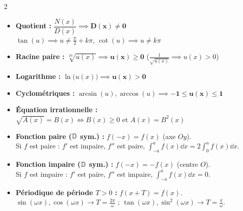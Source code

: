 {\fontsize{9.4pt}{11.4pt}\selectfont
\setlength{\columnsep}{18pt}
\begin{multicols}{2}

\begin{itemize}[leftmargin=1.2em, itemsep=1.5pt, topsep=2pt]
    \item \textbf{Quotient :} $\dfrac{N(x)}{D(x)} \implies \mathbf{D(x) \neq 0}$\\
    $\tan(u) \implies u \neq \frac{\pi}{2} + k\pi$, \quad $\cot(u) \implies u \neq k\pi$
    \item \textbf{Racine paire :} $\sqrt[2n]{u(x)} \implies \mathbf{u(x) \ge 0}$ \quad ($\frac{1}{\sqrt{u(x)}} \implies u(x) > 0$)
    \item \textbf{Logarithme :} $\ln\bigl(u(x)\bigr) \implies \mathbf{u(x) > 0}$
    \item \textbf{Cyclométriques :} $\arcsin(u), \arccos(u) \implies \mathbf{-1 \le u(x) \le 1}$
    \item \textbf{Équation irrationnelle :} $\sqrt{A(x)} = B(x) \iff B(x) \ge 0 \text{ et } A(x) = B^2(x)$
\end{itemize}

\vspace{3pt}
\begin{itemize}[leftmargin=1.2em, itemsep=1.5pt, topsep=2pt]
    \item \textbf{Fonction paire ($\mathbb{D}$ sym.) :} $f(-x) = f(x)$ (axe $Oy$).\\
    Si $f$ est paire : $f'$ est impaire, $f''$ est paire, $\int_{-a}^a f(x)\dd x = 2\int_0^a f(x)\dd x$.
    \item \textbf{Fonction impaire ($\mathbb{D}$ sym.) :} $f(-x) = -f(x)$ (centre $O$).\\
    Si $f$ est impaire : $f'$ est paire, $f''$ est impaire, $\int_{-a}^a f(x)\dd x = 0$.
    \item \textbf{Périodique de période $T > 0$ :} $f(x+T) = f(x)$.\\
    $\sin(\omega x), \cos(\omega x) \to T = \frac{2\pi}{\omega}$ ; \; $\tan(\omega x), \sin^2(\omega x) \to T = \frac{\pi}{\omega}$.
\end{itemize}


\end{multicols}}
